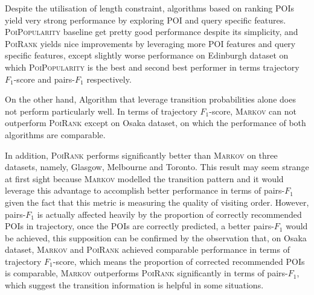 Despite the utilisation of length constraint, algorithms based on ranking POIs yield very strong performance 
by exploring POI and query specific features.
%
\textsc{PoiPopularity} baseline get pretty good performance despite its simplicity, 
and \textsc{PoiRank} yields nice improvements by leveraging more POI features and query specific features,
except slightly worse performance on Edinburgh dataset on which \textsc{PoiPopularity} is the best and 
second best performer in terms trajectory $F_1$-score and pairs-$F_1$ respectively.

On the other hand, Algorithm that leverage transition probabilities alone does not perform particularly well.
%
In terms of trajectory $F_1$-score,
\textsc{Markov} can not outperform \textsc{PoiRank} except on Osaka dataset, 
on which the performance of both algorithms are comparable.

In addition, \textsc{PoiRank} performs significantly better than \textsc{Markov} on three datasets, namely,
Glasgow, Melbourne and Toronto.
%
This result may seem strange at first sight because \textsc{Markov} modelled the transition pattern and it would leverage
this advantage to accomplish better performance in terms of pairs-$F_1$ given the fact that this metric is measuring the quality
of visiting order.
However, pairs-$F_1$ is actually affected heavily by the proportion of correctly recommended POIs in trajectory,
once the POIs are correctly predicted, a better pairs-$F_1$ would be achieved, 
this supposition can be confirmed by the observation that, on Osaka dataset, \textsc{Markov} and \textsc{PoiRank} achieved
comparable performance in terms of trajectory $F_1$-score, which means the proportion of corrected recommended POIs is comparable,
\textsc{Markov} outperforms \textsc{PoiRank} significantly in terms of pairs-$F_1$,
which suggest the transition information is helpful in some situations.

